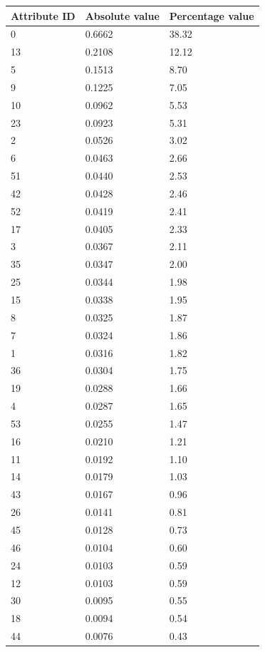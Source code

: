 \documentclass[a4paper, 10pt]{article}
\begin{document}
\renewcommand{\arraystretch}{1.2}
\begin{longtable}{|l|l|l|}
	\hline
Attribute ID & Absolute value & Percentage value \\\hline
0 &  0.6662 &  38.32 \\\hline
13 &  0.2108 &  12.12 \\\hline
5 &  0.1513 &  8.70 \\\hline
9 &  0.1225 &  7.05 \\\hline
10 &  0.0962 &  5.53 \\\hline
23 &  0.0923 &  5.31 \\\hline
2 &  0.0526 &  3.02 \\\hline
6 &  0.0463 &  2.66 \\\hline
51 &  0.0440 &  2.53 \\\hline
42 &  0.0428 &  2.46 \\\hline
52 &  0.0419 &  2.41 \\\hline
17 &  0.0405 &  2.33 \\\hline
3 &  0.0367 &  2.11 \\\hline
35 &  0.0347 &  2.00 \\\hline
25 &  0.0344 &  1.98 \\\hline
15 &  0.0338 &  1.95 \\\hline
8 &  0.0325 &  1.87 \\\hline
7 &  0.0324 &  1.86 \\\hline
1 &  0.0316 &  1.82 \\\hline
36 &  0.0304 &  1.75 \\\hline
19 &  0.0288 &  1.66 \\\hline
4 &  0.0287 &  1.65 \\\hline
53 &  0.0255 &  1.47 \\\hline
16 &  0.0210 &  1.21 \\\hline
11 &  0.0192 &  1.10 \\\hline
14 &  0.0179 &  1.03 \\\hline
43 &  0.0167 &  0.96 \\\hline
26 &  0.0141 &  0.81 \\\hline
45 &  0.0128 &  0.73 \\\hline
46 &  0.0104 &  0.60 \\\hline
24 &  0.0103 &  0.59 \\\hline
12 &  0.0103 &  0.59 \\\hline
30 &  0.0095 &  0.55 \\\hline
18 &  0.0094 &  0.54 \\\hline
44 &  0.0076 &  0.43 \\\hline

\end{longtable}
\end{document}
